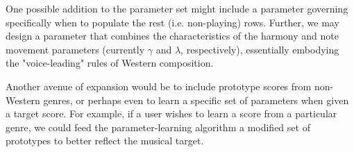 \documentclass{article}
\begin{document}
One possible addition to the parameter set might include a parameter governing specifically when to populate the rest (i.e. non-playing) rows.  Further, we may design a parameter that combines the characteristics of the harmony and note movement parameters (currently $\gamma$ and $\lambda$, respectively), essentially embodying the "voice-leading" rules of Western composition.

Another avenue of expansion would be to include prototype scores from non-Western genres, or perhaps even to learn a specific set of parameters when given a target score.  For example, if a user wishes to learn a score from a particular genre, we could feed the parameter-learning algorithm a modified set of prototypes to better reflect the musical target.
\end{document}
